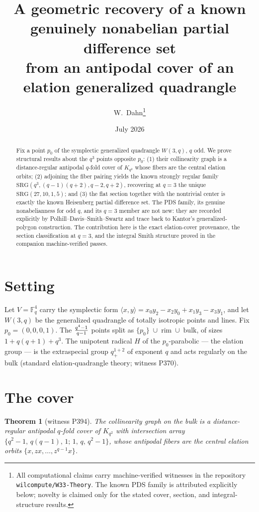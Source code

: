 \documentclass[11pt]{article}
\title{A geometric recovery of a known genuinely nonabelian partial difference set\\ from an antipodal cover of an elation generalized quadrangle}
\author{W.~Dahn\thanks{All computational claims carry machine-verified witnesses in the repository \texttt{wilcompute/W33-Theory}. The known PDS family is attributed explicitly below; novelty is claimed only for the stated cover, section, and integral-structure results.}}
\date{July 2026}
\newtheorem{theorem}{Theorem}
\newcommand{\FF}{\mathbb F}
\begin{document}
\maketitle

\begin{abstract}
\noindent Fix a point $p_0$ of the symplectic generalized quadrangle $W(3,q)$,
$q$ odd. We prove structural results about the $q^3$ points opposite $p_0$:
(1) their collinearity graph is a distance-regular antipodal $q$-fold cover of
$K_{q^2}$ whose fibers are the central elation orbits; (2) adjoining the fiber
pairing yields the known strongly regular family
$\mathrm{SRG}(q^3,(q-1)(q+2),q-2,q+2)$, recovering at $q=3$ the unique
$\mathrm{SRG}(27,10,1,5)$; and (3) the flat section together with the nontrivial
center is exactly the known Heisenberg partial difference set. The PDS family,
its genuine nonabelianness for odd $q$, and its $q=3$ member are not new:
they are recorded explicitly by Polhill--Davis--Smith--Swartz and trace back to
Kantor's generalized-polygon construction. The contribution here is the exact
elation-cover provenance, the section classification at $q=3$, and the integral
Smith structure proved in the companion machine-verified passes.
\end{abstract}

\section{Setting}

Let $V=\FF_q^4$ carry the symplectic form
$\langle x,y\rangle = x_0y_2-x_2y_0+x_1y_3-x_3y_1$, and let $W(3,q)$ be the
generalized quadrangle of totally isotropic points and lines. Fix
$p_0=(0,0,0,1)$. The $q^4-1\over q-1$ points split as
$\{p_0\}\;\cup\;\mathrm{rim}\;\cup\;\mathrm{bulk}$, of sizes
$1+q(q+1)+q^3$. The unipotent radical $H$ of the $p_0$-parabolic --- the
elation group --- is the extraspecial group $q^{1+2}_+$ of exponent $q$ and
acts regularly on the bulk (standard elation-quadrangle theory; witness P370).

\section{The cover}

\begin{theorem}[witness P394]
The collinearity graph on the bulk is a distance-regular antipodal $q$-fold
cover of $K_{q^2}$ with intersection array
$\{q^2-1,\,q(q-1),\,1;\,1,\,q,\,q^2-1\}$, whose antipodal fibers are the
central elation orbits $\{x,zx,\dots,z^{q-1}x\}$.
\end{theorem}
\end{document}

